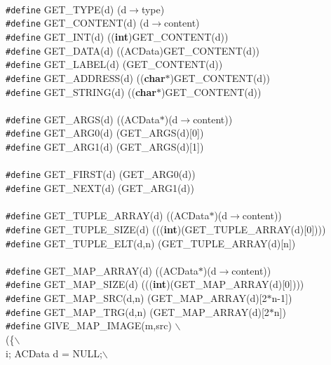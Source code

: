 \begin{flushleft}
\mbox{}\\
{\tt \#define} GET\_TYPE(d) (d$\rightarrow$type)\mbox{}\\
{\tt \#define} GET\_CONTENT(d) (d$\rightarrow$content)\mbox{}\\
{\tt \#define} GET\_INT(d) (({\bf int})GET\_CONTENT(d))\mbox{}\\
{\tt \#define} GET\_DATA(d) ((ACData)GET\_CONTENT(d))\mbox{}\\
{\tt \#define} GET\_LABEL(d) (GET\_CONTENT(d))\mbox{}\\
{\tt \#define} GET\_ADDRESS(d) (({\bf char}$\ast$)GET\_CONTENT(d))\mbox{}\\
{\tt \#define} GET\_STRING(d) (({\bf char}$\ast$)GET\_CONTENT(d))\mbox{}\\
\mbox{}\\
{\tt \#define} GET\_ARGS(d) ((ACData$\ast$)(d$\rightarrow$content))\mbox{}\\
{\tt \#define} GET\_ARG0(d) (GET\_ARGS(d)[0])\mbox{}\\
{\tt \#define} GET\_ARG1(d) (GET\_ARGS(d)[1])\mbox{}\\
\mbox{}\\
{\tt \#define} GET\_FIRST(d) (GET\_ARG0(d))\mbox{}\\
{\tt \#define} GET\_NEXT(d) (GET\_ARG1(d))\mbox{}\\
\mbox{}\\
{\tt \#define} GET\_TUPLE\_ARRAY(d) ((ACData$\ast$)(d$\rightarrow$content))\mbox{}\\
{\tt \#define} GET\_TUPLE\_SIZE(d) ((({\bf int})(GET\_TUPLE\_ARRAY(d)[0])))\mbox{}\\
{\tt \#define} GET\_TUPLE\_ELT(d,n) (GET\_TUPLE\_ARRAY(d)[n])\mbox{}\\
\mbox{}\\
{\tt \#define} GET\_MAP\_ARRAY(d) ((ACData$\ast$)(d$\rightarrow$content))\mbox{}\\
{\tt \#define} GET\_MAP\_SIZE(d) ((({\bf int})(GET\_MAP\_ARRAY(d)[0])))\mbox{}\\
{\tt \#define} GET\_MAP\_SRC(d,n) (GET\_MAP\_ARRAY(d)[2$\ast$n-1])\mbox{}\\
{\tt \#define} GET\_MAP\_TRG(d,n) (GET\_MAP\_ARRAY(d)[2$\ast$n])\mbox{}\\
{\tt \#define} GIVE\_MAP\_IMAGE(m,src) $\backslash$\\
(\{$\backslash$\\
\hspace*{2\indentation}{\bf int} i; ACData d = NULL;$\backslash$\\

\end{flushleft}
